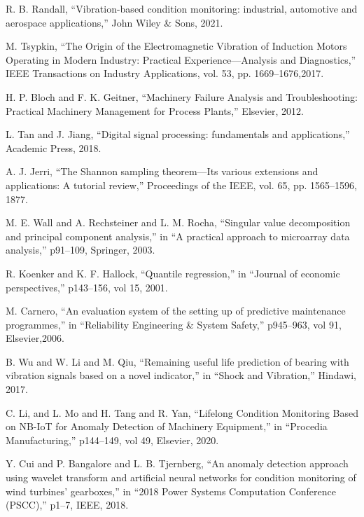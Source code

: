 \documentclass[conference]{IEEEtran}
\begin{document}
\begin{thebibliography}{00}

	 R. B. Randall, ``Vibration-based condition monitoring: industrial, automotive and aerospace applications,'' John Wiley \& Sons, 2021.


     M. Tsypkin, ``The Origin of the Electromagnetic Vibration of Induction Motors Operating in Modern Industry: Practical Experience—Analysis and Diagnostics,'' IEEE Transactions on Industry Applications, vol. 53, pp. 1669--1676,2017.


     H. P. Bloch and F. K. Geitner, ``Machinery Failure Analysis and Troubleshooting: Practical Machinery Management for Process Plants,'' Elsevier, 2012.


     L. Tan and J. Jiang, ``Digital signal processing: fundamentals and applications,'' Academic Press, 2018.


     A. J. Jerri, ``The Shannon sampling theorem—Its various extensions and applications: A tutorial review,'' Proceedings of the IEEE, vol. 65, pp. 1565--1596, 1877.

	 M. E. Wall and A. Rechsteiner and L. M. Rocha, ``Singular value decomposition and principal component analysis,'' in ``A practical approach to microarray data analysis,'' p91--109, Springer, 2003.


	 R. Koenker and K. F. Hallock, ``Quantile regression,'' in ``Journal of economic perspectives,'' p143--156, vol 15, 2001.




	 M. Carnero, ``An evaluation system of the setting up of predictive maintenance programmes,'' in ``Reliability Engineering \& System Safety,'' p945--963, vol 91, Elsevier,2006.
	
	 B. Wu and W. Li and M. Qiu, ``Remaining useful life prediction of bearing with vibration signals based on a novel indicator,'' in ``Shock and Vibration,'' Hindawi, 2017.
	
	 C. Li, and L. Mo and H. Tang and R. Yan, ``Lifelong Condition Monitoring Based on NB-IoT for Anomaly Detection of Machinery Equipment,'' in ``Procedia Manufacturing,'' p144--149, vol 49, Elsevier, 2020.
	
	 Y. Cui and P. Bangalore and L. B. Tjernberg, ``An anomaly detection approach using wavelet transform and artificial neural networks for condition monitoring of wind turbines' gearboxes,'' in ``2018 Power Systems Computation Conference (PSCC),'' p1--7, IEEE, 2018.


\end{thebibliography}
\end{document}
